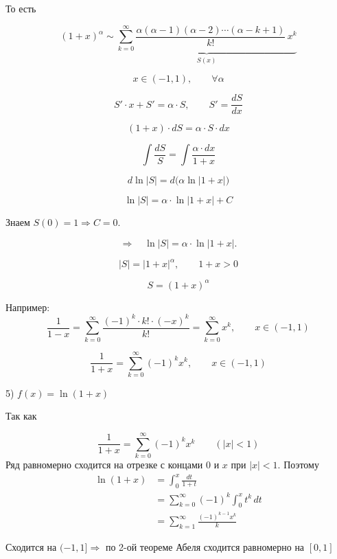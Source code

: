 \documentclass[12pt,a4paper]{article}
\begin{document}
\begin{example}
    То есть

    \[
        (1+x)^\alpha \sim
        \underbrace{
        \sum_{k=0}^{\infty}
        \frac{\alpha(\alpha-1)(\alpha-2)\cdots(\alpha-k+1)}{k!}\,x^k
        }_{S(x)}
    \]

    \[
        x\in(-1,1),\qquad \forall\alpha
    \]

    \[
        S'\cdot x+S'=\alpha\cdot S,
        \qquad
        S'=\frac{dS}{dx}
    \]

    \[
        (1+x)\cdot dS=\alpha\cdot S\cdot dx
    \]

    \[
        \int\frac{dS}{S}
        =
        \int\frac{\alpha\cdot dx}{1+x}
    \]

    \[
        d\ln|S|=d\bigl(\alpha\ln|1+x|\bigr)
    \]

    \[
        \ln|S|=\alpha\cdot\ln|1+x|+C
    \]

    Знаем $S(0)=1\Rightarrow C=0$.

    \[
        \Rightarrow\quad \ln|S|=\alpha\cdot\ln|1+x|.
    \]

    \[
        |S|=|1+x|^\alpha,
        \qquad 1+x>0
    \]

    \[
        S=(1+x)^\alpha
    \]

    Например:
    \[
        \frac{1}{1-x}
        =
        \sum_{k=0}^{\infty}
        \frac{(-1)^k\cdot k!\cdot(-x)^k}{k!}
        =
        \sum_{k=0}^{\infty}x^k,
        \qquad x\in(-1,1)
    \]

    \[
        \frac{1}{1+x}
        =
        \sum_{k=0}^{\infty}(-1)^k x^k,
        \qquad x\in(-1,1)
    \]


    5) $f(x) = \ln(1 + x)$

    Так как

    \[
        \frac{1}{1+x}=\sum_{k=0}^{\infty}(-1)^kx^k\qquad(|x|<1)
    \]
    Ряд равномерно сходится на отрезке с концами $0$ и $x$ при $|x|<1$. Поэтому
    \begin{align*}
        \ln(1+x) &= \int_0^x\frac{dt}{1+t}\\
        &= \sum_{k=0}^{\infty}(-1)^k\int_0^x t^k\,dt\\
        &= \sum_{k=1}^{\infty}\frac{(-1)^{k-1}x^k}{k}
    \end{align*}

    Сходится на $(-1, 1] \Longrightarrow$ по 2-ой теореме Абеля сходится равномерно на $[0, 1]$

\end{example}

\newpage
\end{document}
